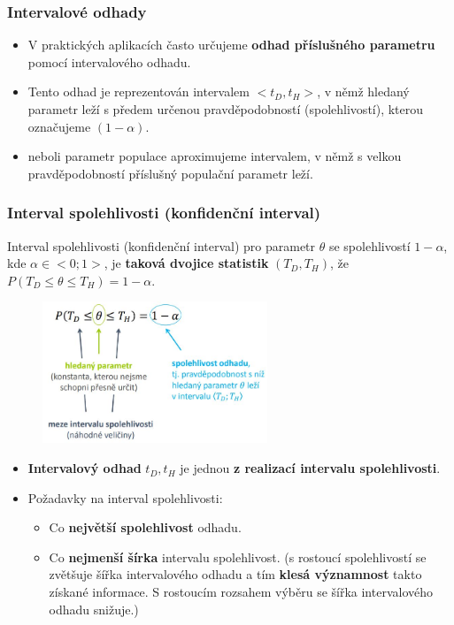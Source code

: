 \subsubsection{Intervalové odhady}
\begin{itemize}
\item V praktických aplikacích často určujeme \textbf{odhad příslušného parametru} pomocí intervalového odhadu.
\item Tento odhad je reprezentován intervalem $<t_D, t_H>$, v němž hledaný parametr leží s předem určenou pravděpodobností (spolehlivostí), kterou označujeme $(1 − \alpha)$.
\item neboli parametr populace aproximujeme intervalem, v němž s velkou pravděpodobností příslušný populační parametr leží.
\end{itemize}

\subsubsection{Interval spolehlivosti (konfidenční interval)}
Interval spolehlivosti (konfidenční interval) pro parametr $\theta$ se spolehlivostí $1−\alpha$, kde $\alpha \in <0; 1>$, je \textbf{taková dvojice statistik} $(T_D, T_H)$, že $P(T_D \leq \theta \leq T_H) = 1 − \alpha$.
\begin{figure}[H]
\centering
\includegraphics[width=0.6\textwidth]{assets/14_inter_odhad_terminologie}
\end{figure}
\begin{itemize}
	\item \textbf{Intervalový odhad} $t_D,t_H$ je jednou \textbf{z realizací intervalu spolehlivosti}.
	\item Požadavky na interval spolehlivosti:
	\begin{itemize}
		\item Co \textbf{největší spolehlivost} odhadu.
		\item Co \textbf{nejmenší šírka} intervalu spolehlivost. (s rostoucí spolehlivostí se zvětšuje šířka intervalového odhadu a tím \textbf{klesá významnost} takto získané informace. S rostoucím rozsahem výběru se šířka intervalového odhadu snižuje.)
	\end{itemize}
\end{itemize}
